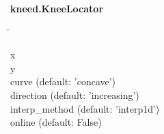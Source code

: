 \begin{leftbar}
    \textbf{kneed.KneeLocator}
    \begin{nstabbing}
        \qquad\qquad\qquad\qquad\qquad\quad\=\kill

        x \> \\
        
        y \> \\
        
        curve \> (default: 'concave')\\
        
        direction \> (default: 'increasing')\\
        
        interp\_method \> (default: 'interp1d')\\
        
        online \> (default: False)\\
        
    \end{nstabbing}
\end{leftbar}

